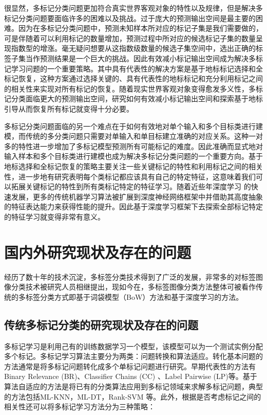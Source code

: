 很显然，多标记分类问题更加符合真实世界客观对象的特性以及规律，但是解决多标记分类问题要面临许多的困难以及挑战。过于庞大的预测输出空间是最主要的困难。因为在多标记分类问题中，预测未知样本所对应的标记子集是我们需要做的，可是伴随着可以利用标记的数量增加，预测过程中所对应的候选标记子集的数量呈现指数型的增涨。毫无疑问想要从这指数级数量的候选子集空间中，选出正确的标签子集当作预测结果是一个巨大的挑战。因此有效减小标记输出空间成为解决多标记学习问题的一个重要策略。其中具有代表性的解决方案是基于地标标记选择和全标记恢复，这种方案通过选择关键的、具有代表性的地标标记和充分利用标记之间的相关性来实现对所有标记的恢复。随着现实世界客观对象变得愈发多义性，多标记分类面临更大的预测输出空间，研究如何有效减小标记输出空间和探索基于地标引导从而恢复所有标记就变得十分必要。

多标记分类问题面临的另一个难点在于如何有效地对单个输入和多个目标类进行建模，而传统的多分类问题只需要对单输入和单目标建立准确的对应关系。这种一对多的特性进一步增加了多标记模型预测所有可能标记的难度。因此准确而显式地对输入样本和多个目标类进行建模也成为解决多标记分类问题的一个重要方向。基于地标选择和全标记恢复的策略主要关注一些关键标记的特性和利用标记之间的相关性，进一步地有研究表明每个类标记都应该具有自己的特定特征，这意味着我们可以拓展关键标记的特性到所有类标记特定的特征学习。随着近些年深度学习\cite{Read2011Classifier} 的快速发展，更多的传统机器学习算法被扩展到深度神经网络框架中并借助其高度抽象的特征表达能力来获得性能的提升。因此基于深度学习框架下去探索全部标记特定的特征学习就变得非常有意义。

\section{国内外研究现状及存在的问题}
经历了数十年的技术沉淀，多标签分类技术得到了广泛的发展，非常多的对标签图像分类技术被研究人员相继提出，现如今在，多标签图像分类方法整体可被看作传统的多标签分类方式即基于词袋模型（BoW）方法和基于深度学习的方法。

\subsection{传统多标记分类的研究现状及存在的问题}
多标记学习是利用己有的训练数据学习一个模型，该模型可以为一个测试实例分配多个标记。多标记学习算法主要分为两类：问题转换和算法适应。转化基本问题的方法通常是将多标记问题转化成多个单标记问题进行研究。早期代表性的方法有Binary Relevance (BR)、Classifier Chains (CC) \cite{Read2011Classifier}、Label Pairwise (LP)\cite{Tsoumakas2007Random}等。基于算法自适应的方法是将已有的分类算法应用到多标记领域来求解多标记问题，典型的方法包括ML-KNN\cite{Zhang2007ML}，ML-DT\cite{Clare2002Knowledge}，Rank-SVM 等。此外，根据是否考虑标记之间的相关性还可以将多标记学习方法分为三种策略\cite{Agrawal2013Multi}：


